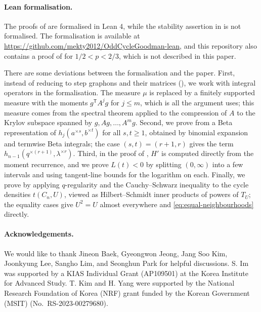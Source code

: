 \documentclass[11pt]{article}
\theoremstyle{remark}
\numberwithin{equation}{section}
\newcommand{\tC}[2]{t(C_{#1},#2)}
\newcommand{\Tker}[1]{T_{#1}}
\begin{document}
\paragraph{Lean formalisation.}
The proofs of  are formalised in Lean 4, while the stability assertion in  is not formalised.
The formalisation is available at \url{https://github.com/mekty2012/OddCycleGoodman-lean}, and this repository also contains a proof of  for $1/2<p<2/3$, which is not described in this paper.

There are some deviations between the formalisation and the paper.
First, instead of reducing to step graphons and their matrices (), we work with integral operators in the formalisation.
The measure $\mu$ is replaced by a finitely supported measure with the moments $g^{\mathsf T}A^jg$ for $j\le m$, which is all the argument uses; this measure comes from the spectral theorem applied to the compression of $A$ to the Krylov subspace spanned by $g,Ag,\ldots,A^mg$.
Second, we prove  from a Beta representation of $h_j(a^{\times s},b^{\times t})$ for all $s,t\ge1$, obtained by binomial expansion and termwise Beta integrals; the case $(s,t)=(r+1,r)$ gives the term $h_{n-1}(q^{\times(r+1)},\lambda^{\times r})$.
Third, in the proof of , $H'$ is computed directly from the moment recurrence, and we prove $L(t)<0$ by splitting $(0,\infty)$ into a few intervals and using tangent-line bounds for the logarithm on each.
Finally, we prove  by applying $q$-regularity and the Cauchy--Schwarz inequality to the cycle densities $\tC nU$, viewed as Hilbert--Schmidt inner products of powers of $\Tker U$; the equality cases give $U^2=U$ almost everywhere and \eqref{eq:equal-neighbourhoods} directly.



\paragraph{Acknowledgements.}
We would like to thank Jineon Baek, Gyeongwon Jeong, Jang Soo Kim, Joonkyung Lee,
Sangho Lim, and Seonghun Park for helpful discussions.
S. Im was supported by a KIAS Individual Grant (AP109501) at the Korea Institute for Advanced Study.
T. Kim and H. Yang were supported by the National Research Foundation of Korea (NRF)
grant funded by the Korean Government (MSIT) (No.~RS-2023-00279680).
\end{document}
